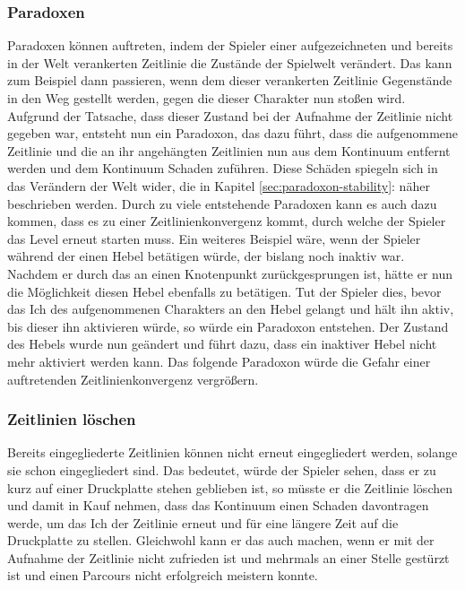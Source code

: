 \subsubsection{Paradoxen} 
Paradoxen können auftreten, indem der Spieler einer aufgezeichneten und bereits in der Welt verankerten Zeitlinie die Zustände der Spielwelt verändert. Das kann zum Beispiel dann passieren, wenn dem  dieser verankerten Zeitlinie Gegenstände in den Weg gestellt werden, gegen die dieser Charakter nun stoßen wird. Aufgrund der Tatsache, dass dieser Zustand bei der Aufnahme der Zeitlinie nicht gegeben war, entsteht nun ein Paradoxon, das dazu führt, dass die aufgenommene Zeitlinie und die an ihr angehängten Zeitlinien nun aus dem Kontinuum entfernt werden und dem Kontinuum Schaden zuführen. Diese Schäden spiegeln sich in das Verändern der Welt wider, die in Kapitel \ref{sec:paradoxon-stability}:  näher beschrieben werden. Durch zu viele entstehende Paradoxen kann es auch dazu kommen, dass es zu einer Zeitlinienkonvergenz kommt, durch welche der Spieler das Level erneut starten muss. Ein weiteres Beispiel wäre, wenn der Spieler während der  einen Hebel betätigen würde, der bislang noch inaktiv war. Nachdem er durch das  an einen Knotenpunkt zurückgesprungen ist, hätte er nun die Möglichkeit diesen Hebel ebenfalls zu betätigen. Tut der Spieler dies, bevor das Ich des aufgenommenen Charakters an den Hebel gelangt und hält ihn aktiv, bis dieser ihn aktivieren würde, so würde ein Paradoxon entstehen. Der Zustand des Hebels wurde nun geändert und führt dazu, dass ein inaktiver Hebel nicht mehr aktiviert werden kann. Das folgende Paradoxon würde die Gefahr einer auftretenden Zeitlinienkonvergenz vergrößern.

\subsubsection{Zeitlinien löschen}
Bereits eingegliederte Zeitlinien können nicht erneut eingegliedert werden, solange sie schon eingegliedert sind. Das bedeutet, würde der Spieler sehen, dass er zu kurz auf einer Druckplatte stehen geblieben ist, so müsste er die Zeitlinie löschen und damit in Kauf nehmen, dass das Kontinuum einen Schaden davontragen werde, um das Ich der Zeitlinie erneut und für eine längere Zeit auf die Druckplatte zu stellen. Gleichwohl kann er das auch machen, wenn er mit der Aufnahme der Zeitlinie nicht zufrieden ist und mehrmals an einer Stelle gestürzt ist und einen Parcours nicht erfolgreich meistern konnte.

